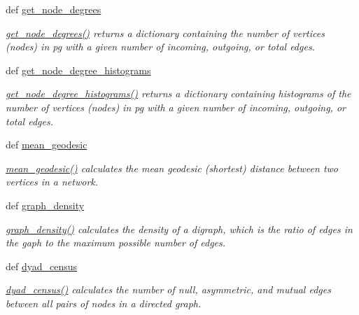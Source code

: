 \begin{CompactItemize}
def \hyperlink{namespacePyPedal_1_1pyp__network_99fa1fd8ff5dc1479afeec03ec4ce9fe}{get\_\-node\_\-degrees}
\begin{CompactList}\small\item\em \hyperlink{namespacePyPedal_1_1pyp__network_99fa1fd8ff5dc1479afeec03ec4ce9fe}{get\_\-node\_\-degrees()} returns a dictionary containing the number of vertices (nodes) in pg with a given number of incoming, outgoing, or total edges. \item\end{CompactList}\item 
def \hyperlink{namespacePyPedal_1_1pyp__network_7abe5f06621472c95b183cc8fd521cc4}{get\_\-node\_\-degree\_\-histograms}
\begin{CompactList}\small\item\em \hyperlink{namespacePyPedal_1_1pyp__network_7abe5f06621472c95b183cc8fd521cc4}{get\_\-node\_\-degree\_\-histograms()} returns a dictionary containing histograms of the number of vertices (nodes) in pg with a given number of incoming, outgoing, or total edges. \item\end{CompactList}\item 
def \hyperlink{namespacePyPedal_1_1pyp__network_7c69193d5911cfb1deb21a6bd45a9423}{mean\_\-geodesic}
\begin{CompactList}\small\item\em \hyperlink{namespacePyPedal_1_1pyp__network_7c69193d5911cfb1deb21a6bd45a9423}{mean\_\-geodesic()} calculates the mean geodesic (shortest) distance between two vertices in a network. \item\end{CompactList}\item 
def \hyperlink{namespacePyPedal_1_1pyp__network_5f7dd88164c3ad27f54fa8905494a02a}{graph\_\-density}
\begin{CompactList}\small\item\em \hyperlink{namespacePyPedal_1_1pyp__network_5f7dd88164c3ad27f54fa8905494a02a}{graph\_\-density()} calculates the density of a digraph, which is the ratio of edges in the gaph to the maximum possible number of edges. \item\end{CompactList}\item 
def \hyperlink{namespacePyPedal_1_1pyp__network_2d0c4f1e9cb1ea3163aef28c9b3a7ac0}{dyad\_\-census}
\begin{CompactList}\small\item\em \hyperlink{namespacePyPedal_1_1pyp__network_2d0c4f1e9cb1ea3163aef28c9b3a7ac0}{dyad\_\-census()} calculates the number of null, asymmetric, and mutual edges between all pairs of nodes in a directed graph. \item\end{CompactList}\item 

\end{CompactItemize}
